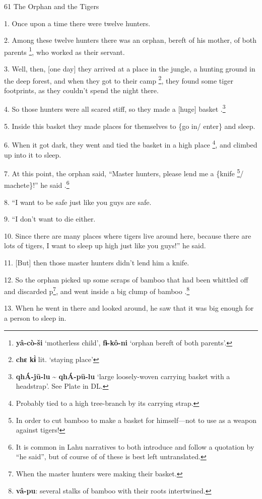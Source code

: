 
61 The Orphan and the Tigers

1. Once upon a time there were twelve hunters.

2. Among these twelve hunters there was an orphan, bereft of his mother, of both
parents \footnote{\textbf{yâ-cò-ši }`motherless child', \textbf{fɨ-kô-ni} `orphan bereft of both parents'.}, who worked as their servant.

3. Well, then, [one day] they arrived at a place in the jungle, a hunting ground
in the deep forest, and when they got to their camp \footnote{\textbf{chɛ kɨ̀} lit. `staying place'}, they found some tiger
footprints, as they couldn't spend the night there.

4. So those hunters were all scared stiff, so they made a [huge] basket .\footnote{\textbf{qhÁ-jū-lu }\textasciitilde{}\textbf{ qhÁ-pū-lu} `large loosely-woven carrying basket with a headstrap'. See Plate in DL.}

5. Inside this basket they made places for themselves to \{go in/ enter\} and sleep.

6. When it got dark, they went and tied the basket in a high place \footnote{Probably tied to a high tree-branch by its carrying strap.}, and climbed
up into it to sleep.

7. At this point, the orphan said, ``Master hunters, please lend me a \{knife \footnote{In order to cut bamboo to make a basket for himself---not to use as a weapon against tigers!}/
machete\}!'' he said .\footnote{It is common in Lahu narratives to both introduce and follow a quotation by ``he said'', but of course of of these is best left untranslated.}

8. ``I want to be safe just like you guys are safe.

9. ``I don't want to die either.

10. Since there are many places where tigers live around here, because there are
lots of tigers, I want to sleep up high just like you guys!'' he said.

11. [But] then those master hunters didn't lend him a knife.

12. So the orphan picked up some scraps of bamboo that had been whittled off and
discarded p\footnote{When the master hunters were making their basket.}, and went inside a big clump of bamboo .\footnote{\textbf{vâ-pu}: several stalks of bamboo with their roots intertwined.}

13. When he went in there and looked around, he saw that it was big enough for
a person to sleep in.

